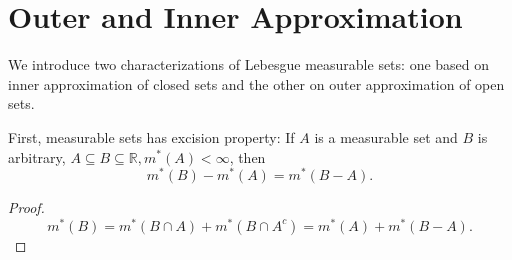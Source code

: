 \documentclass[../main.tex]{subfiles}
\begin{document}
\section{Outer and Inner Approximation}

We introduce two characterizations of Lebesgue measurable sets: one based on inner approximation of closed sets and the other on outer approximation of open sets.

First, measurable sets has excision property: If $A$ is a measurable set and $B$ is arbitrary, $A \subseteq B \subseteq \mathbb{R}, m^*(A) < \infty $, then
\begin{equation*}
	m^*(B) - m^*(A) = m^*(B - A).
\end{equation*}

\begin{proof}
\begin{equation*}
	m^*(B) = m^*(B\cap A) + m^*(B\cap A^c) = m^*(A) + m^*(B-A).
\end{equation*}
\end{proof}
\end{document}
